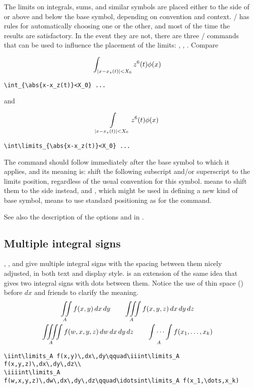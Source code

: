 The limits on integrals, sums, and similar symbols are placed either to
the side of or above and below the base symbol, depending on convention
and context. \lat/ has rules for automatically choosing one or the
other, and most of the time the results are satisfactory. In the event
they are not, there are three \lat/ commands that can be used to
influence the placement of the limits: , ,
. Compare
\begin{center}
\begin{minipage}{.4\columnwidth}
\[\int_{\lvert x-x_z(t)\rvert<X_0} z^6(t)\phi(x)\]
\begin{verbatim}
\int_{\abs{x-x_z(t)}<X_0} ...
\end{verbatim}
\end{minipage}\quad
and\quad
\begin{minipage}{.5\columnwidth}
\[\int\limits_{\lvert x-x_z(t)\rvert<X_0} z^6(t)\phi(x)\]
\begin{verbatim}
\int\limits_{\abs{x-x_z(t)}<X_0} ...
\end{verbatim}
\end{minipage}
\end{center}
The  command should follow immediately after the base symbol
to which it applies, and its meaning is: shift the following subscript
and/or superscript to the limits position, regardless of the usual
convention for this symbol.  means to shift them to the
side instead, and , which might be used in defining
a new kind of base symbol, means to use standard positioning as for the
 command.

See also the description of the options  and
 in \cite{amsldoc}.

\subsection{Multiple integral signs}

, , and  give multiple integral
signs with the spacing between them nicely
adjusted, in both text and display style.  is an extension
of the same idea that gives two integral signs with dots between them.
Notice the use of thin space (\cn{,})
before $dx$ and friends to clarify the meaning.
\begin{gather}
\iint\limits_A f(x,y)\,dx\,dy\qquad\iiint\limits_A
f(x,y,z)\,dx\,dy\,dz\\
\iiiint\limits_A
f(w,x,y,z)\,dw\,dx\,dy\,dz\qquad\idotsint\limits_A f(x_1,\dots,x_k)
\end{gather}
\begin{verbatim}
\iint\limits_A f(x,y)\,dx\,dy\qquad\iiint\limits_A
f(x,y,z)\,dx\,dy\,dz\\
\iiiint\limits_A
f(w,x,y,z)\,dw\,dx\,dy\,dz\qquad\idotsint\limits_A f(x_1,\dots,x_k)
\end{verbatim}

